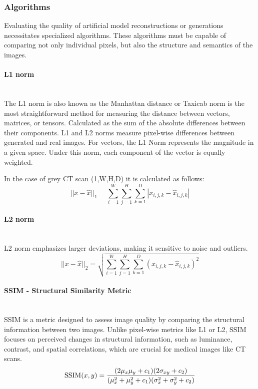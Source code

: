 \subsubsection{Algorithms}
Evaluating the quality of artificial model reconstructions or generations necessitates specialized algorithms. These algorithms must be capable of comparing not only individual pixels, but also the structure and semantics of the images.
\paragraph{L1 norm}\mbox{}\\
The L1 norm is also known as the Manhattan distance or Taxicab norm is the most straightforward method for measuring the distance between vectors, matrices, or tensors. Calculated as the sum of the absolute differences between their components. 
L1 and L2 norms measure pixel-wise differences between generated and real images.
For vectors, the L1 Norm represents the magnitude in a given space. Under this norm, each component of the vector is equally weighted. 

In the case of grey CT scan (1,W,H,D) it is calculated as follows:
\begin{equation}
||x-\hat{x}||_1 = \sum_{i=1}^{W} \sum_{j=1}^{H} \sum_{k=1}^{D} |x_{i,j,k}-\hat{x}_{i,j,k}|
\label{norm-l1}
\end{equation}

\paragraph{L2 norm}\mbox{}\\
L2 norm emphasizes larger deviations, making it sensitive to noise and outliers.
\begin{equation}
||x-\hat{x}||_2 = \sqrt{\sum_{i=1}^{W} \sum_{j=1}^{H} \sum_{k=1}^{D} {(x_{i,j,k}-\hat{x}_{i,j,k})^2}}
\label{norm-l2}
\end{equation}
\paragraph{SSIM - Structural Similarity Metric}\mbox{}\\
SSIM is a metric designed to assess image quality by comparing the structural information between two images. Unlike pixel-wise metrics like L1 or L2, SSIM focuses on perceived changes in structural information, such as luminance, contrast, and spatial correlations, which are crucial for medical images like CT scans.
\begin{equation}
    \hbox{SSIM}(x,y) = \frac{(2\mu_x\mu_y + c_1)(2\sigma_{xy} + c_2)}{(\mu_x^2 + \mu_y^2 + c_1)(\sigma_x^2 + \sigma_y^2 + c_2)}
\end{equation}

